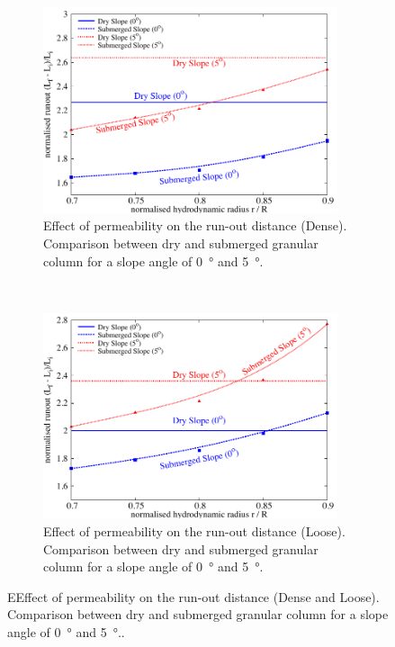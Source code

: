 \begin{figure}
	\centering
\begin{subfigure}[b]{0.95\textwidth}
	\centering
    \includegraphics[width=0.95\textwidth]{Perm_Runout_a08_dense}
    \caption{Effect of permeability on the run-out distance (Dense). Comparison 
    between dry and submerged granular column for a slope angle of 
    0~\si{\degree} and 5~\si{\degree}.}
    \label{fig:Perm_Runout_a08_dense}
\end{subfigure}\\
\begin{subfigure}[b]{0.95\textwidth}
	\centering
    \includegraphics[width=0.95\textwidth]{Perm_Runout_a08_loose}
    \caption{Effect of permeability on the run-out distance (Loose). Comparison 
        between dry and submerged granular column for a slope angle of 
        0~\si{\degree} and 5~\si{\degree}.}
    \label{fig:Perm_Runout_a08_loose}
\end{subfigure}
\caption{EEffect of permeability on the run-out distance (Dense and Loose). 
	Comparison between dry and submerged granular column for a slope angle of 
    0~\si{\degree} and 5~\si{\degree}..}
\label{fig:Perm_Runout_loose_dense}
\end{figure}


